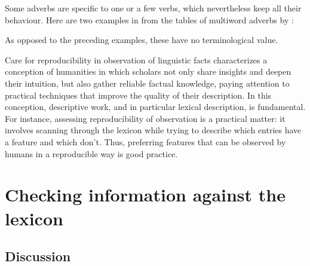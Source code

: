 \documentclass[output=paper]{langsci/langscibook}
\begin{document}
 
Some adverbs are specific to one or a few verbs, which nevertheless keep all their behaviour. Here are two examples in  from the tables of multiword adverbs by \citet{Gross1986}:

\begin{exe}
\ex \label{53}
\begin{xlist}
\end{xlist}
\end{exe}

\noindent As opposed to the preceding examples, these have no terminological value.
\newpage   

Care for reproducibility in observation of linguistic facts characterizes a conception of humanities in which scholars not only share insights and deepen their intuition, but also gather reliable factual knowledge, paying attention to practical techniques that improve the quality of their description. In this conception, descriptive work, and in particular lexical description, is fundamental. For instance, assessing reproducibility of observation is a practical matter: it involves scanning through the lexicon while trying to describe which entries have a feature and which don’t. Thus, preferring features that can be observed by humans in a reproducible way is good practice.


\section{Checking information against the lexicon}
\label{sec:5}

\subsection{Discussion} 
\label{sec:51}
\end{document}
